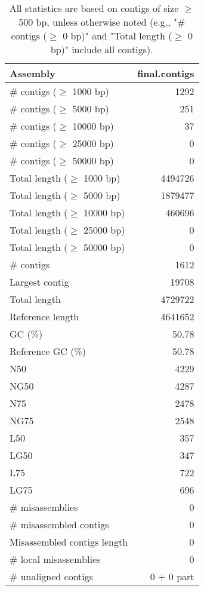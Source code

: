 \documentclass[12pt,a4paper]{article}
\begin{document}
\begin{table}[ht]
\begin{center}
\caption{All statistics are based on contigs of size $\geq$ 500 bp, unless otherwise noted (e.g., "\# contigs ($\geq$ 0 bp)" and "Total length ($\geq$ 0 bp)" include all contigs).}
\begin{tabular}{|l*{1}{|r}|}
\hline
Assembly & final.contigs \\ \hline
\# contigs ($\geq$ 1000 bp) & 1292 \\ \hline
\# contigs ($\geq$ 5000 bp) & 251 \\ \hline
\# contigs ($\geq$ 10000 bp) & 37 \\ \hline
\# contigs ($\geq$ 25000 bp) & 0 \\ \hline
\# contigs ($\geq$ 50000 bp) & 0 \\ \hline
Total length ($\geq$ 1000 bp) & 4494726 \\ \hline
Total length ($\geq$ 5000 bp) & 1879477 \\ \hline
Total length ($\geq$ 10000 bp) & 460696 \\ \hline
Total length ($\geq$ 25000 bp) & 0 \\ \hline
Total length ($\geq$ 50000 bp) & 0 \\ \hline
\# contigs & 1612 \\ \hline
Largest contig & 19708 \\ \hline
Total length & 4729722 \\ \hline
Reference length & 4641652 \\ \hline
GC (\%) & 50.78 \\ \hline
Reference GC (\%) & 50.78 \\ \hline
N50 & 4229 \\ \hline
NG50 & 4287 \\ \hline
N75 & 2478 \\ \hline
NG75 & 2548 \\ \hline
L50 & 357 \\ \hline
LG50 & 347 \\ \hline
L75 & 722 \\ \hline
LG75 & 696 \\ \hline
\# misassemblies & 0 \\ \hline
\# misassembled contigs & 0 \\ \hline
Misassembled contigs length & 0 \\ \hline
\# local misassemblies & 0 \\ \hline
\# unaligned contigs & 0 + 0 part \\ \hline

\end{tabular}
\end{center}
\end{table}
\end{document}
